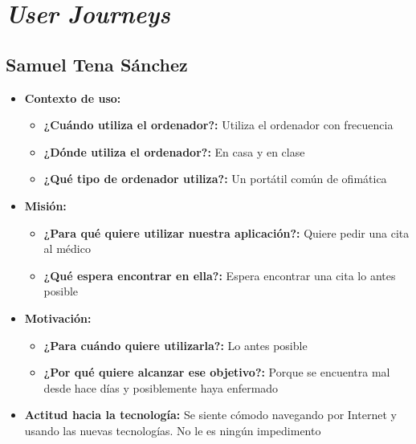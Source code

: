 \UseRawInputEncoding
\section{\textit{User Journeys}}\label{anexo}

\subsection{Samuel Tena Sánchez}
\begin{itemize}
    \item \textbf{Contexto de uso: }
    \begin{itemize}
        \item \textbf{¿Cuándo utiliza el ordenador?: }  Utiliza el ordenador con frecuencia
        \item \textbf{¿Dónde utiliza el ordenador?: } En casa y en clase
        \item \textbf{¿Qué tipo de ordenador utiliza?: } Un portátil común de ofimática
    \end{itemize}
    \item \textbf{Misión: }
    \begin{itemize}
        \item \textbf{¿Para qué quiere utilizar nuestra aplicación?: } Quiere pedir una cita al médico
        \item \textbf{¿Qué espera encontrar en ella?: } Espera encontrar una cita lo antes posible
    \end{itemize}
    \item \textbf{Motivación: }
    \begin{itemize}
        \item \textbf{¿Para cuándo quiere utilizarla?: } Lo antes posible
        \item \textbf{¿Por qué quiere alcanzar ese objetivo?: } Porque se encuentra mal desde hace días y posiblemente haya enfermado
    \end{itemize}
    \item \textbf{Actitud hacia la tecnología: } Se siente cómodo navegando por Internet y usando las nuevas tecnologías. No le es ningún impedimento
\end{itemize}

